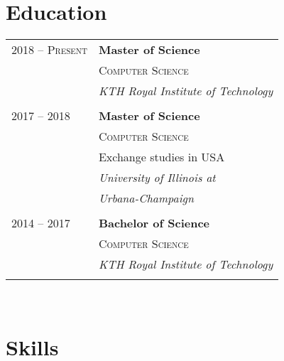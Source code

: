 \documentclass[10pt]{article} %
\begin{document}
{\begin{minipage}[t]{0.44\textwidth}

\section{Education} 

\begin{tabular}{ll} %


2018 -- \textsc{Present} & \textbf{Master of Science} \\ 
& \textsc{Computer Science} \\ 
& \textit{KTH Royal Institute of Technology}\\
&\\
	 
2017 -- 2018 & \textbf{Master of Science} \\ 
& \textsc{Computer Science} \\ 
& \small Exchange studies in USA\\
& \textit{University of Illinois at} \\
& \textit{Urbana-Champaign} \\
&\\

2014 -- 2017 & \textbf{Bachelor of Science} \\ 
& \textsc{Computer Science} \\ 
& \textit{KTH Royal Institute of Technology}\\
&\\
	

\end{tabular}\\[10pt]


\section{Skills} 


\end{minipage}}
\end{document}

